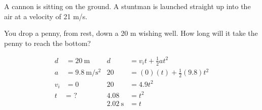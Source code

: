 \documentclass[10pt]{exam}
\begin{document}
\begin{questions}
  \pagebreak
  \printeqs

  \question 
    A cannon is sitting on the ground.  A stuntman is launched straight up into the air at a velocity of 21 m/s.


  \question
    You drop a penny, from rest, down a 20 m wishing well.  How long will it take the penny to reach the bottom?

    \begin{solution}[\stretch{1}]
      \begin{align*}
        d   &= \SI{20}{\meter}    & 
                              d &= v_i t+\frac{1}{2}at^2 \\
        a   &= \SI{9.8}{\meter\per\second^2} &
                      20 &= (0)(t) + \frac{1}{2}(9.8)t^2 \\
        v_i &= 0     &
                                           20 &= 4.9t^2 \\
        t &= \text{ ?} & 
                                        4.08 &= t^2 \\
        &&                \SI{2.02}{\second} &= t
      \end{align*}
    \end{solution}


\end{questions}
\end{document}
